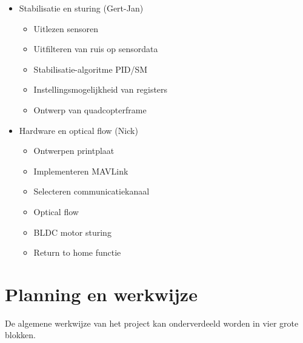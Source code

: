 		\begin{itemize}
			\item  Stabilisatie en sturing (Gert-Jan)
				\begin{itemize}
					\item Uitlezen sensoren
					\item Uitfilteren van ruis op sensordata
					\item Stabilisatie-algoritme PID/SM
					\item Instellingsmogelijkheid van registers
					\item Ontwerp van quadcopterframe
				\end{itemize}
			\item  Hardware en optical flow (Nick)
				\begin{itemize}
					\item Ontwerpen printplaat
					\item Implementeren MAVLink
					\item Selecteren communicatiekanaal
					\item Optical flow
					\item BLDC motor sturing
					\item Return to home functie
				\end{itemize}
		\end{itemize}
\newpage
	\section{Planning en werkwijze}

		\par De algemene werkwijze van het project kan onderverdeeld worden in vier grote blokken.

